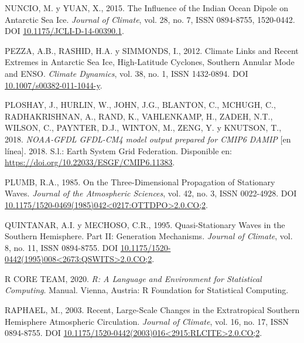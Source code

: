 \documentclass[12pt,oneside,a4paper]{reedthesis}
\newlength{\cslhangindent}
\newenvironment{CSLReferences}[2] %
 {%
  \setlength{\parindent}{0pt}
  \ifodd #1 \everypar{\setlength{\hangindent}{\cslhangindent}}\ignorespaces\fi
  \ifnum #2 > 0
  \setlength{\parskip}{#2\baselineskip}
  \fi
 }%
 {}
\begin{document}
\begin{CSLReferences}{1}{0}
\leavevmode{}%
NUNCIO, M. y YUAN, X., 2015. The {Influence} of the {Indian Ocean Dipole} on {Antarctic Sea Ice}. \emph{Journal of Climate}, vol. 28, no. 7, ISSN 0894-8755, 1520-0442. DOI \href{https://doi.org/10.1175/JCLI-D-14-00390.1}{10.1175/JCLI-D-14-00390.1}.

\leavevmode{}%
PEZZA, A.B., RASHID, H.A. y SIMMONDS, I., 2012. Climate Links and Recent Extremes in Antarctic Sea Ice, High-Latitude Cyclones, {Southern Annular Mode} and {ENSO}. \emph{Climate Dynamics}, vol. 38, no. 1, ISSN 1432-0894. DOI \href{https://doi.org/10.1007/s00382-011-1044-y}{10.1007/s00382-011-1044-y}.

\leavevmode{}%
PLOSHAY, J., HURLIN, W., JOHN, J.G., BLANTON, C., MCHUGH, C., RADHAKRISHNAN, A., RAND, K., VAHLENKAMP, H., ZADEH, N.T., WILSON, C., PAYNTER, D.J., WINTON, M., ZENG, Y. y KNUTSON, T., 2018. \emph{NOAA-GFDL GFDL-CM4 model output prepared for CMIP6 DAMIP} {[}en línea{]}. 2018. S.l.: Earth System Grid Federation. Disponible en: \url{https://doi.org/10.22033/ESGF/CMIP6.11383}.

\leavevmode{}%
PLUMB, R.A., 1985. On the {Three-Dimensional Propagation} of {Stationary Waves}. \emph{Journal of the Atmospheric Sciences}, vol. 42, no. 3, ISSN 0022-4928. DOI \href{https://doi.org/10.1175/1520-0469(1985)042\%3C0217:OTTDPO\%3E2.0.CO;2}{10.1175/1520-0469(1985)042\textless0217:OTTDPO\textgreater2.0.CO;2}.

\leavevmode{}%
QUINTANAR, A.I. y MECHOSO, C.R., 1995. Quasi-{Stationary Waves} in the {Southern Hemisphere}. {Part II}: {Generation Mechanisms}. \emph{Journal of Climate}, vol. 8, no. 11, ISSN 0894-8755. DOI \href{https://doi.org/10.1175/1520-0442(1995)008\%3C2673:QSWITS\%3E2.0.CO;2}{10.1175/1520-0442(1995)008\textless2673:QSWITS\textgreater2.0.CO;2}.

\leavevmode{}%
R CORE TEAM, 2020. \emph{R: {A} Language and Environment for Statistical Computing}. Manual. {Vienna, Austria}: {R Foundation for Statistical Computing}.

\leavevmode{}%
RAPHAEL, M., 2003. Recent, {Large-Scale Changes} in the {Extratropical Southern Hemisphere Atmospheric Circulation}. \emph{Journal of Climate}, vol. 16, no. 17, ISSN 0894-8755. DOI \href{https://doi.org/10.1175/1520-0442(2003)016\%3C2915:RLCITE\%3E2.0.CO;2}{10.1175/1520-0442(2003)016\textless2915:RLCITE\textgreater2.0.CO;2}.


\end{CSLReferences}
\end{document}
